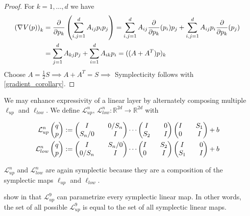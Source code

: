 \documentclass[twoside,a4paper]{article}
\begin{document}
\begin{proof}
	For $k=1, \dots, d$ we have
	\begin{align*}
		\left( \nabla_{}{V}(p) \right)_k &= \frac{\partial }{\partial p_k} \left( \sum_{i,j=1}^d A_{ij} p_i p_j \right)
		= \sum_{i,j=1}^d A_{ij} \frac{\partial }{\partial p_k}(p_i) p_j + \sum_{i,j=1}^d A_{ij} p_i \frac{\partial }{\partial p_k}(p_j) \\
		&= \sum_{j=1}^d A_{kj} p_j + \sum_{i=1}^d A_{ik} p_i = ((A+A^T)p)_k \\
	\end{align*}
	Choose $A=\frac{1}{2}S \implies A+A^T=S \implies$
	Symplecticity follows with \cref{gradient_corollary}.
\end{proof}

We may enhance expressivity of a linear layer by alternately composing multiple
$\ell_{up}$ and $\ell_{low}$. We define 
$\mathcal{L}^{n}_{up},\, \mathcal{L}^{n}_{low} : \mathbb{R}^{2d} \to \mathbb{R}^{2d}$ with

\begin{align*}
	\mathcal{L}^{n}_{up} \begin{pmatrix} q \\ p \end{pmatrix} &:= \begin{pmatrix}
		I && 0 / S_n \\
		S_n / 0 && I
	\end{pmatrix}
	\cdots
	\begin{pmatrix}
		I && 0 \\
		S_2 && I
	\end{pmatrix}
	\begin{pmatrix}
		I && S_1 \\
		0 && I
	\end{pmatrix} + b \\
	\mathcal{L}^{n}_{low} \begin{pmatrix} q \\ p \end{pmatrix} &:= \begin{pmatrix}
		I && S_n / 0 \\
		0 / S_n && I
	\end{pmatrix}
	\cdots
	\begin{pmatrix}
		I && S_2 \\
		0 && I
	\end{pmatrix}
	\begin{pmatrix}
		I && 0 \\
		S_1 && I
	\end{pmatrix} + b
\end{align*}

$\mathcal{L}^{n}_{up}$ and $\mathcal{L}^{n}_{low}$ are again symplectic because they 
are a composition of the symplectic maps $\ell_{up}$ and $\ell_{low}$.

\citeauthor{jin2020unit} show in \cite{jin2020unit} that $\mathcal{L}^{9}_{up}$
can parametrize every symplectic linear map. In other words, 
the set of all possible $\mathcal{L}^{9}_{up}$ is equal to the set of all symplectic linear maps.
\end{document}
